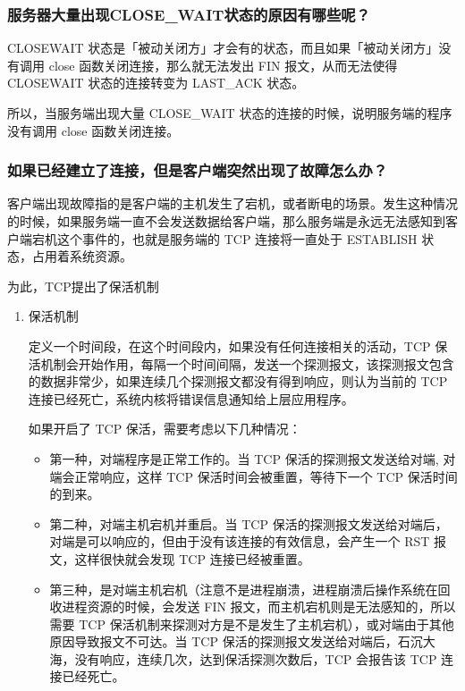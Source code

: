 \documentclass[11pt]{article}
\begin{document}
\subsubsection{服务器大量出现CLOSE\_WAIT状态的原因有哪些呢？}
\label{sec:org082ad07}
CLOSEWAIT 状态是「被动关闭方」才会有的状态，而且如果「被动关闭方」没有调用 close 函数关闭连接，那么就无法发出 FIN 报文，从而无法使得 CLOSEWAIT 状态的连接转变为 LAST\_ACK 状态。

所以，当服务端出现大量 CLOSE\_WAIT 状态的连接的时候，说明服务端的程序没有调用 close 函数关闭连接。
\subsubsection{如果已经建立了连接，但是客户端突然出现了故障怎么办？}
\label{sec:org9b1d9bc}

客户端出现故障指的是客户端的主机发生了宕机，或者断电的场景。发生这种情况的时候，如果服务端一直不会发送数据给客户端，那么服务端是永远无法感知到客户端宕机这个事件的，也就是服务端的 TCP 连接将一直处于 ESTABLISH 状态，占用着系统资源。

为此，TCP提出了保活机制
\begin{enumerate}
\item 保活机制
\label{sec:org3a51b1a}

定义一个时间段，在这个时间段内，如果没有任何连接相关的活动，TCP 保活机制会开始作用，每隔一个时间间隔，发送一个探测报文，该探测报文包含的数据非常少，如果连续几个探测报文都没有得到响应，则认为当前的 TCP 连接已经死亡，系统内核将错误信息通知给上层应用程序。

如果开启了 TCP 保活，需要考虑以下几种情况：
\begin{itemize}
\item 第一种，对端程序是正常工作的。当 TCP 保活的探测报文发送给对端, 对端会正常响应，这样 TCP 保活时间会被重置，等待下一个 TCP 保活时间的到来。
\item 第二种，对端主机宕机并重启。当 TCP 保活的探测报文发送给对端后，对端是可以响应的，但由于没有该连接的有效信息，会产生一个 RST 报文，这样很快就会发现 TCP 连接已经被重置。
\item 第三种，是对端主机宕机（注意不是进程崩溃，进程崩溃后操作系统在回收进程资源的时候，会发送 FIN 报文，而主机宕机则是无法感知的，所以需要 TCP 保活机制来探测对方是不是发生了主机宕机），或对端由于其他原因导致报文不可达。当 TCP 保活的探测报文发送给对端后，石沉大海，没有响应，连续几次，达到保活探测次数后，TCP 会报告该 TCP 连接已经死亡。
\end{itemize}
\end{enumerate}
\end{document}
